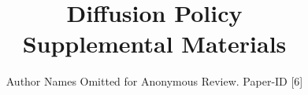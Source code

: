 \documentclass[conference]{IEEEtran}
\begin{document}
\title{Diffusion Policy \\ \LARGE{Supplemental Materials}}


\author{Author Names Omitted for Anonymous Review. Paper-ID [6]}














\maketitle
\IEEEpeerreviewmaketitle













\end{document}
